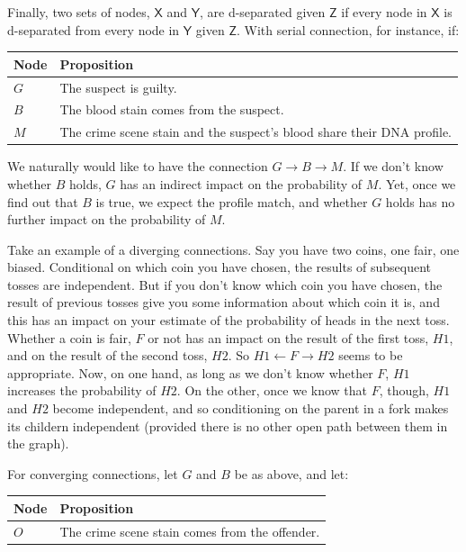\documentclass[
  10pt,
  dvipsnames,enabledeprecatedfontcommands]{scrartcl}
\begin{document}
\noindent Finally, two sets of nodes, \(\mathsf{X}\) and \(\mathsf{Y}\),
are d-separated given \(\mathsf{Z}\) if every node in \(\mathsf{X}\) is
d-separated from every node in \(\mathsf{Y}\) given \(\mathsf{Z}\). With
serial connection, for instance, if:

\footnotesize 
\begin{center}
\begin{tabular}{@{}lp{4.3cm}@{}}\toprule
Node & Proposition \\ \midrule 
$G$ & The suspect is guilty. \\
$B$ & The blood stain comes from the suspect.\\
$M$ & The crime scene stain and the suspect's blood share their DNA profile.\\
\bottomrule
\end{tabular}
\end{center}
\normalsize

\noindent We naturally would like to have the connection
\(G \rightarrow B \rightarrow M\). If we don't know whether \(B\) holds,
\(G\) has an indirect impact on the probability of \(M\). Yet, once we
find out that \(B\) is true, we expect the profile match, and whether
\(G\) holds has no further impact on the probability of \(M\).

Take an example of a diverging connections. Say you have two coins, one
fair, one biased. Conditional on which coin you have chosen, the results
of subsequent tosses are independent. But if you don't know which coin
you have chosen, the result of previous tosses give you some information
about which coin it is, and this has an impact on your estimate of the
probability of heads in the next toss. Whether a coin is fair, \(F\) or
not has an impact on the result of the first toss, \(H1\), and on the
result of the second toss, \(H2\). So \(H1 \leftarrow F \rightarrow H2\)
seems to be appropriate. Now, on one hand, as long as we don't know
whether \(F\), \(H1\) increases the probability of \(H2\). On the other,
once we know that \(F\), though, \(H1\) and \(H2\) become independent,
and so conditioning on the parent in a fork makes its childern
independent (provided there is no other open path between them in the
graph).

For converging connections, let \(G\) and \(B\) be as above, and let:

\begin{center}
\begin{tabular}{@{}lp{4.3cm}@{}}\toprule
Node & Proposition \\ \midrule 
$O$ & The crime scene stain comes from the offender.\\
\bottomrule
\end{tabular}
\end{center}
\normalsize
\end{document}
